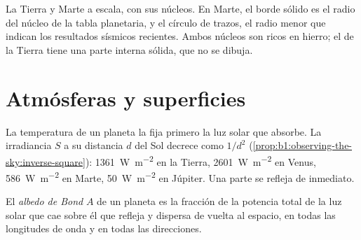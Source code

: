 \begin{omfigure}

{\small La Tierra y Marte a escala, con sus núcleos. En Marte, el borde sólido es el radio del
núcleo de la tabla planetaria, y el círculo de trazos, el radio menor que indican los resultados
sísmicos recientes. Ambos núcleos son ricos en hierro; el de la Tierra tiene una parte interna
sólida, que no se dibuja.}
\end{omfigure}

\section{Atmósferas y superficies}

La temperatura de un planeta la fija primero la luz solar que absorbe. La irradiancia $S$ a su
distancia $d$ del Sol decrece como $1/d^2$ (\cref{prop:b1:observing-the-sky:inverse-square}):
\qty{1361}{W.m^{-2}} en la Tierra, \qty{2601}{W.m^{-2}} en Venus, \qty{586}{W.m^{-2}} en Marte,
\qty{50}{W.m^{-2}} en Júpiter. Una parte se refleja de inmediato.

\begin{definition}\label{def:b1:comparative-planetology:albedo}
El \emph{albedo de Bond} $A$ de un planeta es la fracción de la potencia
total de la luz solar que cae sobre él que refleja y dispersa de vuelta al espacio, en todas las
longitudes de onda y en todas las direcciones.
\end{definition}

